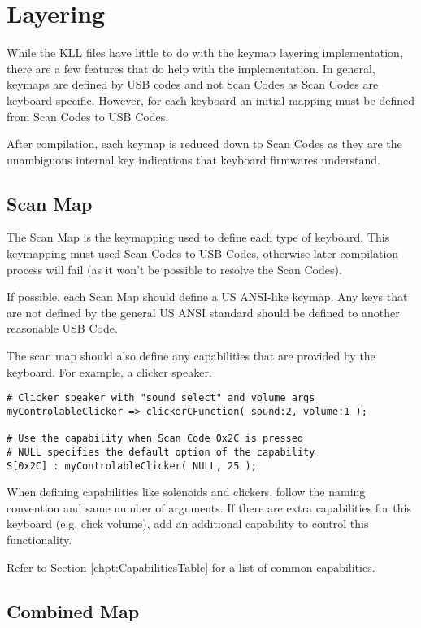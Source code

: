 \documentclass{kiibohd-template}
\begin{document}
\chapter{Layering}

While the KLL files have little to do with the keymap layering implementation, there are a few features that do help with the implementation.
In general, keymaps are defined by USB codes and not Scan Codes as Scan Codes are keyboard specific.
However, for each keyboard an initial mapping must be defined from Scan Codes to USB Codes.

After compilation, each keymap is reduced down to Scan Codes as they are the unambiguous internal key indications that keyboard firmwares understand.


\section{Scan Map}

The Scan Map is the keymapping used to define each type of keyboard.
This keymapping must used Scan Codes to USB Codes, otherwise later compilation process will fail (as it won't be possible to resolve the Scan Codes).

If possible, each Scan Map should define a US ANSI-like keymap.
Any keys that are not defined by the general US ANSI standard should be defined to another reasonable USB Code.

The scan map should also define any capabilities that are provided by the keyboard.
For example, a clicker speaker.

\begin{lstlisting}
# Clicker speaker with "sound select" and volume args
myControlableClicker => clickerCFunction( sound:2, volume:1 );

# Use the capability when Scan Code 0x2C is pressed
# NULL specifies the default option of the capability
S[0x2C] : myControlableClicker( NULL, 25 );
\end{lstlisting}

When defining capabilities like solenoids and clickers, follow the naming convention and same number of arguments.
If there are extra capabilities for this keyboard (e.g. click volume), add an additional capability to control this functionality.

Refer to Section \ref{chpt:CapabilitiesTable} for a list of common capabilities.


\section{Combined Map}
\end{document}
